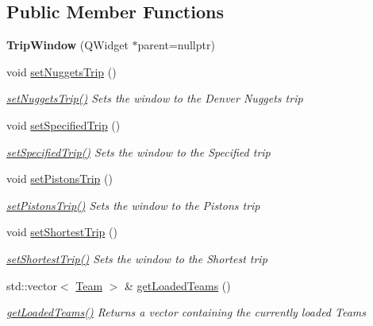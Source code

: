 \subsection*{Public Member Functions}
\begin{DoxyCompactItemize}
\item 
\mbox{\label{class_trip_window_a1827498c546476a81c56dd48ef471933}} 
{\bfseries Trip\+Window} (Q\+Widget $\ast$parent=nullptr)
\item 
void \mbox{\hyperlink{class_trip_window_a1cba8e72154a26bb2a4c8a240b559824}{set\+Nuggets\+Trip}} ()
\begin{DoxyCompactList}\small\item\em \mbox{\hyperlink{class_trip_window_a1cba8e72154a26bb2a4c8a240b559824}{set\+Nuggets\+Trip()}} Sets the window to the Denver Nuggets trip \end{DoxyCompactList}\item 
void \mbox{\hyperlink{class_trip_window_a218b804ec1d07721d0b5b69aeacfdc25}{set\+Specified\+Trip}} ()
\begin{DoxyCompactList}\small\item\em \mbox{\hyperlink{class_trip_window_a218b804ec1d07721d0b5b69aeacfdc25}{set\+Specified\+Trip()}} Sets the window to the Specified trip \end{DoxyCompactList}\item 
void \mbox{\hyperlink{class_trip_window_a2ee37fbce38c78242d3ad8acecd42491}{set\+Pistons\+Trip}} ()
\begin{DoxyCompactList}\small\item\em \mbox{\hyperlink{class_trip_window_a2ee37fbce38c78242d3ad8acecd42491}{set\+Pistons\+Trip()}} Sets the window to the Pistons trip \end{DoxyCompactList}\item 
void \mbox{\hyperlink{class_trip_window_a15e3c7981197598f0a54feb03a31b023}{set\+Shortest\+Trip}} ()
\begin{DoxyCompactList}\small\item\em \mbox{\hyperlink{class_trip_window_a15e3c7981197598f0a54feb03a31b023}{set\+Shortest\+Trip()}} Sets the window to the Shortest trip \end{DoxyCompactList}\item 
std\+::vector$<$ \mbox{\hyperlink{class_team}{Team}} $>$ \& \mbox{\hyperlink{class_trip_window_a3e7069c4f2e25f84f8e1cc25eedabaa0}{get\+Loaded\+Teams}} ()
\begin{DoxyCompactList}\small\item\em \mbox{\hyperlink{class_trip_window_a3e7069c4f2e25f84f8e1cc25eedabaa0}{get\+Loaded\+Teams()}} Returns a vector containing the currently loaded Teams \end{DoxyCompactList}\end{DoxyCompactItemize}


